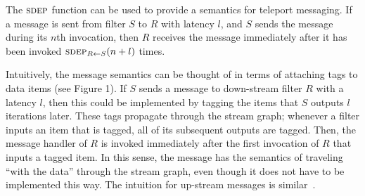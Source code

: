 \documentclass{csailabstractbook}
\begin{document}
The $\textsc{sdep}$ function can be used to provide a semantics for
teleport messaging.  If a message is sent from filter $S$ to $R$ with
latency $l$, and $S$ sends the message during its $n$th invocation,
then $R$ receives the message immediately after it has been invoked
$\textsc{sdep}_{R \small{\leftarrow} S}(n+l)$ times.

Intuitively, the message semantics can be thought of in terms of
attaching tags to data items (see Figure 1). If $S$ sends a message to
down-stream filter $R$ with a latency $l$, then this could be
implemented by tagging the items that $S$ outputs $l$ iterations
later. These tags propagate through the stream graph; whenever a
filter inputs an item that is tagged, all of its subsequent outputs
are tagged.  Then, the message handler of $R$ is invoked immediately
after the first invocation of $R$ that inputs a tagged item. In this
sense, the message has the semantics of traveling ``with the data''
through the stream graph, even though it does not have to be
implemented this way.  The intuition for up-stream messages is
similar~\cite{sdep04}.

\end{document}
